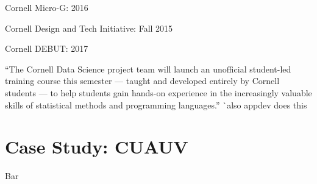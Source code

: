 \documentclass[12pt]{article}
\begin{document}
Cornell Micro-G: 2016
\cite{ghosh_student_2016}

Cornell Design and Tech Initiative: Fall 2015
\cite{noauthor_cornell_2018-3}

Cornell DEBUT: 2017
\cite{noauthor_cornell_2018-4}




``The Cornell Data Science project team will launch an unofficial student-led training course this semester — taught and developed entirely by Cornell students — to help students gain hands-on experience in the increasingly valuable skills of statistical methods and programming languages.''
\cite{si_cornell_2017}
^^ also appdev does this


\cite{emily_hopkins_10_2012}
\cite{noauthor_q&rebecca_2014}

\section{Case Study: CUAUV}
Bar



\end{document}

